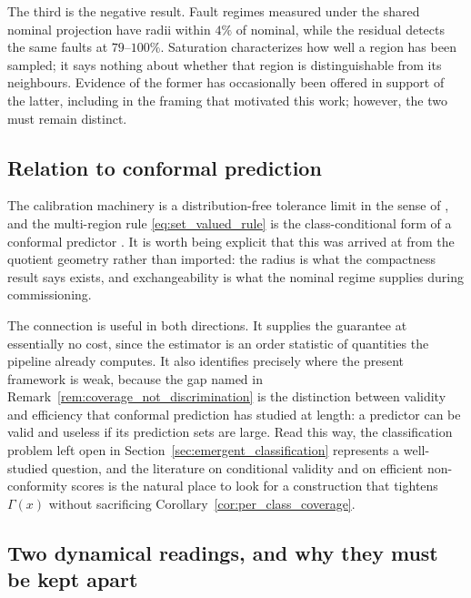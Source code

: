 \documentclass[a4paper]{cas-sc}
\begin{document}
The third is the negative result. Fault regimes measured under the shared
nominal projection have radii within \(4\%\) of nominal, while the residual
detects the same faults at \(79\)--\(100\%\). Saturation characterizes how well
a region has been sampled; it says nothing about whether that region is
distinguishable from its neighbours. Evidence of the former has occasionally
been offered in support of the latter, including in the framing that motivated
this work; however, the two must remain distinct.

\subsection{Relation to conformal prediction}
\label{subsec:disc_conformal}

The calibration machinery is a distribution-free tolerance limit in the sense
of \citet{wilks1941}, and the multi-region rule
\eqref{eq:set_valued_rule} is the class-conditional form of a conformal
predictor \citep{vovk2005,shafer2008}. It is worth being explicit that this
was arrived at from the quotient geometry rather than imported: the radius is
what the compactness result says exists, and exchangeability is what the
nominal regime supplies during commissioning.

The connection is useful in both directions. It supplies the guarantee at
essentially no cost, since the estimator is an order statistic of quantities
the pipeline already computes. It also identifies precisely where the present
framework is weak, because the gap named in
Remark~\ref{rem:coverage_not_discrimination} is the distinction between
validity and efficiency that conformal prediction has studied at length: a
predictor can be valid and useless if its prediction sets are large. Read this
way, the classification problem left open in
Section~\ref{sec:emergent_classification} represents a well-studied question,
and the literature on conditional validity and on efficient
non-conformity scores is the natural place to look for a construction that
tightens \(\Gamma(x)\) without sacrificing
Corollary~\ref{cor:per_class_coverage}.

\subsection{Two dynamical readings, and why they must be kept apart}
\label{subsec:disc_dynamics}
\end{document}
